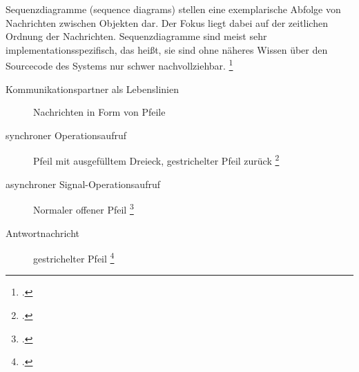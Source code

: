 \documentclass{bschlangaul-theorie}
\begin{document}
\begin{liQuellen}
\cite[Seite 401-471]{rupp}
\cite[Zusammengefügtes PDF Seite 115-117 / Kapitel „Assoziationen“ 33-35]{brinda}
\end{liQuellen}

Sequenzdiagramme (sequence diagrams) stellen eine exemplarische Abfolge
von Nachrichten zwischen Objekten dar. Der Fokus liegt dabei auf der
zeitlichen Ordnung der Nachrichten. Sequenzdiagramme sind meist sehr
implementationsspezifisch, das heißt, sie sind ohne näheres Wissen
über den Sourcecode des Systems nur schwer nachvollziehbar.
\footcite[Seite 167]{schatten}

\begin{description}
\item[Kommunikationspartner als Lebenslinien]

Nachrichten in Form von Pfeile

\item[synchroner Operationsaufruf]
Pfeil mit ausgefülltem Dreieck, gestrichelter Pfeil zurück
\footcite[Seite 507 (PDF 523): \emph{Synchronous Messages typically
represent operation calls and are shown with a filled arrow head.}]{uml}


\item[asynchroner Signal-Operationsaufruf]
Normaler offener Pfeil
%
\footcite[Seite 507 (PDF 523): \emph{Asynchronous Messages have an open
arrow head.}]{uml}


\item[Antwortnachricht]
gestrichelter Pfeil
%
\footcite[Seite 507 (PDF 523): \emph{The reply message from a method has a dashed
line.}]{uml}


\end{description}
\end{document}
